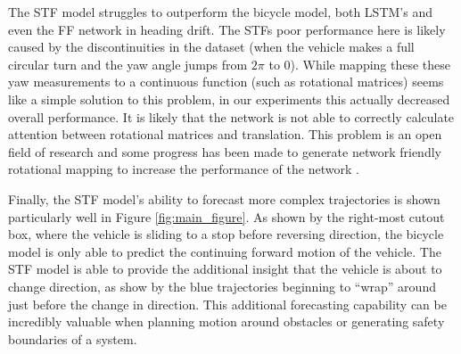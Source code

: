 \documentclass[letterpaper, 10 pt, conference]{ieeeconf}  %
\begin{document}
The STF model struggles to outperform the bicycle model, both LSTM's and even the FF network in heading drift. The STFs poor performance here is likely caused by the discontinuities in the dataset (when the vehicle makes a full circular turn and the yaw angle jumps from $2\pi$ to 0). While mapping these these yaw measurements to a continuous function (such as rotational matrices) seems like a simple solution to this problem, in our experiments this actually decreased overall performance. It is likely that the network is not able to correctly calculate attention between rotational matrices and translation. This problem is an open field of research and some progress has been made to generate network friendly rotational mapping to increase the performance of the network \cite{zhou2018}.

Finally, the STF model's ability to forecast more complex trajectories is shown particularly well in Figure \ref{fig:main_figure}. As shown by the right-most cutout box, where the vehicle is sliding to a stop before reversing direction, the bicycle model is only able to predict the continuing forward motion of the vehicle. The STF model is able to provide the additional insight that the vehicle is about to change direction, as show by the blue trajectories beginning to ``wrap'' around just before the change in direction. This additional forecasting capability can be incredibly valuable when planning motion around obstacles or generating safety boundaries of a system. 
\end{document}
